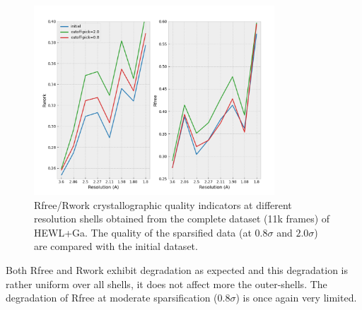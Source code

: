 \documentclass[preprint]{iucr}              %
\begin{document}
\begin{figure}
\label{nicolas_R}
\begin{center}
\includegraphics[width=9cm]{nicolas5.2}
\caption{Rfree/Rwork crystallographic quality indicators at different resolution shells obtained from the complete dataset (11k frames) of HEWL+Ga. The quality of the sparsified data (at $0.8\sigma$ and $2.0\sigma$) are compared with the initial dataset.}
\end{center}
\end{figure}

Both Rfree and Rwork exhibit degradation as expected and this degradation is rather uniform over all shells, it does not affect more the outer-shells.%
The degradation of Rfree at moderate sparsification ($0.8 \sigma$) is once again very limited.
\end{document}
